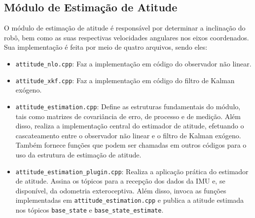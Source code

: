 \subsection{Módulo de Estimação de Atitude}
O módulo de estimação de atitude é responsável por determinar a inclinação do robô, bem como as suas respectivas velocidades angulares nos eixos coordenados. Sua implementação é feita por meio de quatro arquivos, sendo eles:
\begin{itemize}
    \item \texttt{attitude\_nlo.cpp}: Faz a implementação em código do observador não linear.
    \item \texttt{attitude\_xkf.cpp}: Faz a implementação em código do filtro de Kalman exógeno.
    \item \texttt{attitude\_estimation.cpp}: Define as estruturas fundamentais do módulo, tais como matrizes de covariância de erro, de processo e de medição. Além disso, realiza a implementação central do estimador de atitude, efetuando o cascateamento entre o observador não linear e o filtro de Kalman exógeno. Também fornece funções que podem ser chamadas em outros códigos para o uso da estrutura de estimação de atitude.
    \item \texttt{attitude\_estimation\_plugin.cpp}: Realiza a aplicação prática do estimador de atitude. Assina os tópicos para a recepção dos dados da IMU e, se disponível, da odometria exteroceptiva. Além disso, invoca as funções implementadas em \texttt{attitude\_estimation.cpp} e publica a atitude estimada nos tópicos \texttt{base\_state} e \texttt{base\_state\_estimate}. 
\end{itemize}

